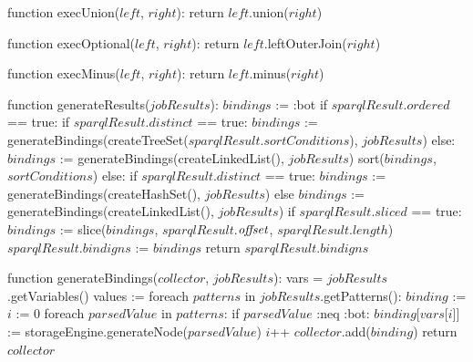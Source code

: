 function execUnion($left$, $right$):
    return $left$.union($right$)

function execOptional($left$, $right$):
    return $left$.leftOuterJoin($right$)

function execMinus($left$, $right$):
    return $left$.minus($right$)

function generateResults($jobResults$):
    $bindings$ := :bot
    if $sparqlResult$.$ordered$ == true:
        if $sparqlResult$.$distinct$ == true:
            $bindings$ := generateBindings(createTreeSet($sparqlResult$.$sortConditions$), $jobResults$)
        else:
            $bindings$ := generateBindings(createLinkedList(), $jobResults$)
            sort($bindings$, $sortConditions$)
    else:
        if $sparqlResult$.$distinct$ == true:
            $bindings$ := generateBindings(createHashSet(), $jobResults$)
        else
            $bindings$ := generateBindings(createLinkedList(), $jobResults$)
    if $sparqlResult$.$sliced$ == true:
        $bindings$ := slice($bindings$, $sparqlResult$.$\textrm{\textit{offset}}$, $sparqlResult$.$length$)
    $sparqlResult$.$bindigns$ := $bindings$
    return $sparqlResult$.$bindigns$

function generateBindings($collector$, $jobResults$):
    vars = $jobResults$.getVariables()
    values := {}
    foreach $patterns$ in $jobResults$.getPatterns():
        $binding$ := {}
        $i$ := 0
        foreach $parsedValue$ in $patterns$:
            if $parsedValue$ :neq :bot:
                $binding$[$vars$[$i$]] := storageEngine.generateNode($parsedValue$)
            $i$++
        $collector$.add($binding$)
    return $collector$